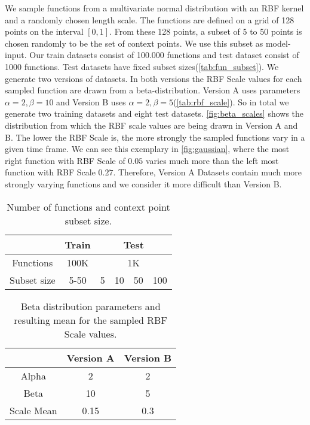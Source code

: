 We sample functions from a multivariate normal distribution with an RBF kernel and a randomly chosen length scale. The functions are defined on a grid of 128 points on the interval $[0,1]$. From these 128 points, a subset of 5 to 50 points is chosen randomly to be the set of context points. We use this subset as model-input. Our train datasets consist of 100.000 functions and test dataset consist of 1000 functions. Test datasets have fixed subset sizes(\autoref{tab:fun_subset}). We generate two versions of datasets. In both versions the RBF Scale values for each sampled function are drawn from a beta-distribution. Version A uses parameters $\alpha = 2, \beta = 10$ and Version B uses $\alpha = 2, \beta = 5$(\autoref{tab:rbf_scale}). So in total we generate two training datasets and eight test datasets. \autoref{fig:beta_scales} shows the distribution from which the RBF scale values are being drawn in Version A and B. The lower the RBF Scale is, the more strongly the sampled functions vary in a given time frame. We can see this exemplary in \autoref{fig:gaussian}, where the most right function with RBF Scale of $0.05$ varies much more than the left most function with RBF Scale $0.27$. Therefore, Version A Datasets contain much more strongly varying functions and we consider it more difficult than Version B.

\begin{table}[]
	\centering
	\caption{Number of functions and context point subset size.}
	\begin{tabular}{c c c c c c}
		\toprule
		& Train & \multicolumn{4}{c}{Test}\\
		\midrule
		Functions & 100K & \multicolumn{4}{c}{1K}\\
		Subset size & 5-50 & 5 & 10 & 50 & 100  \\\bottomrule
	\end{tabular}
\label{tab:fun_subset}
\end{table}

\begin{table}[]
	\centering
	\caption{Beta distribution parameters and resulting mean for the sampled RBF Scale values.}
	\begin{tabular}{c c c}
		\toprule
		& Version A & Version B\\
		\midrule
		Alpha & 2 & 2\\
		Beta & 10 & 5  \\\midrule
		Scale Mean & 0.15 & 0.3\\\bottomrule
	\end{tabular}
\label{tab:rbf_scale}
\end{table}


